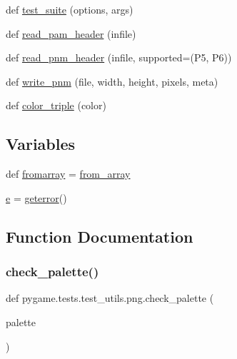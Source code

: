 \begin{DoxyCompactItemize}
def \hyperlink{namespacepygame_1_1tests_1_1test__utils_1_1png_a839ec35073dd4ca5a116d3e8bfc0ae80}{test\+\_\+suite} (options, args)
\item 
def \hyperlink{namespacepygame_1_1tests_1_1test__utils_1_1png_afaa4429949cbbb618d0878dcef29f436}{read\+\_\+pam\+\_\+header} (infile)
\item 
def \hyperlink{namespacepygame_1_1tests_1_1test__utils_1_1png_ac372143020db06e8a3fb9b1a427f41af}{read\+\_\+pnm\+\_\+header} (infile, supported=(\textquotesingle{}P5\textquotesingle{}, \textquotesingle{}P6\textquotesingle{}))
\item 
def \hyperlink{namespacepygame_1_1tests_1_1test__utils_1_1png_afe203f587eb83f794595e0f9fb20e6d7}{write\+\_\+pnm} (file, width, height, pixels, meta)
\item 
def \hyperlink{namespacepygame_1_1tests_1_1test__utils_1_1png_a5af064ebde1023f999865fd5472ec43f}{color\+\_\+triple} (color)
\end{DoxyCompactItemize}
\subsection*{Variables}
\begin{DoxyCompactItemize}
\item 
def \hyperlink{namespacepygame_1_1tests_1_1test__utils_1_1png_ab59a28e874fba706fd3e00f149e605c2}{fromarray} = \hyperlink{namespacepygame_1_1tests_1_1test__utils_1_1png_a418565b84a8b6f5e9b805640799d9b7d}{from\+\_\+array}
\item 
\hyperlink{namespacepygame_1_1tests_1_1test__utils_1_1png_a91482421768ca72a01b0be21f239bd96}{e} = \hyperlink{namespacepygame_1_1tests_1_1test__utils_a5f6446aff1b4a74a9c37d4a770796ccc}{geterror}()
\end{DoxyCompactItemize}


\subsection{Function Documentation}
\mbox{\label{namespacepygame_1_1tests_1_1test__utils_1_1png_a5759868289f0edd9de3d42f8fe7d8e59}} 
\subsubsection{\texorpdfstring{check\+\_\+palette()}{check\_palette()}}
{\footnotesize\ttfamily def pygame.\+tests.\+test\+\_\+utils.\+png.\+check\+\_\+palette (\begin{DoxyParamCaption}\item[{}]{palette }\end{DoxyParamCaption})}

